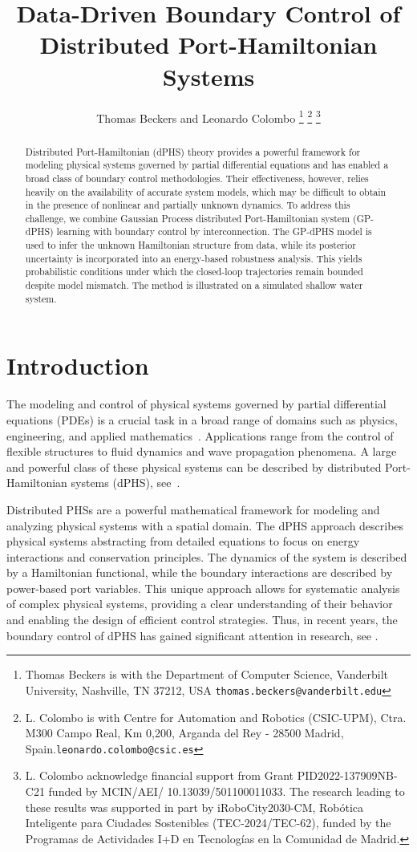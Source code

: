 \documentclass[letterpaper, 10 pt, conference]{ieeeconf}  %
\title{\LARGE \bf
Data-Driven Boundary Control of Distributed Port-Hamiltonian Systems
}
\author{Thomas Beckers and Leonardo Colombo%
\thanks{Thomas Beckers is with the Department of Computer Science, Vanderbilt University, Nashville, TN 37212, USA {\tt\small thomas.beckers@vanderbilt.edu}}%
\thanks{L. Colombo is with Centre for Automation and Robotics (CSIC-UPM), Ctra. M300 Campo Real, Km 0,200, Arganda
del Rey - 28500 Madrid, Spain.{\tt\small leonardo.colombo@csic.es}} 
\thanks{ L. Colombo acknowledge financial support from Grant PID2022-137909NB-C21 funded by MCIN/AEI/ 10.13039/501100011033. The research leading to these results was supported in part by iRoboCity2030-CM, Robótica Inteligente para Ciudades Sostenibles (TEC-2024/TEC-62), funded by the Programas de Actividades I+D en Tecnologías en la Comunidad de Madrid.}
}
\newcounter{part} %
\begin{document}
\maketitle
\thispagestyle{empty}
\pagestyle{empty}


\begin{abstract}
Distributed Port-Hamiltonian (dPHS) theory provides a powerful framework for modeling physical systems governed by partial differential equations and has enabled a broad class of boundary control methodologies. Their effectiveness, however, relies heavily on the availability of accurate system models, which may be difficult to obtain in the presence of nonlinear and partially unknown dynamics. To address this challenge, we combine Gaussian Process distributed Port-Hamiltonian system (GP-dPHS) learning with boundary control by interconnection. The GP-dPHS model is used to infer the unknown Hamiltonian structure from data, while its posterior uncertainty is incorporated into an energy-based robustness analysis. This yields probabilistic conditions under which the closed-loop trajectories remain bounded despite model mismatch. The method is illustrated on a simulated shallow water system.
\end{abstract}


\section{Introduction}
The modeling and control of physical systems governed by partial differential equations (PDEs) is a crucial task in a broad range of domains such as physics, engineering, and applied mathematics~\cite{derler2011modeling}. Applications range from the control of flexible structures to fluid dynamics and wave propagation phenomena. A large and powerful class of these physical systems can be described by distributed Port-Hamiltonian systems (dPHS), see~\cite{van2002hamiltonian, macchelli2004port}.

Distributed PHSs are a powerful mathematical framework for modeling and analyzing physical systems with a spatial domain. The dPHS approach describes physical systems abstracting from detailed equations to focus on energy interactions and conservation principles. The dynamics of the system is described by a Hamiltonian functional, while the boundary interactions are described by power-based port variables. This unique approach allows for systematic analysis of complex physical systems, providing a clear understanding of their behavior and enabling the design of efficient control strategies. Thus, in recent years, the boundary control of dPHS has gained significant attention in research, see \cite{van2000l2, le2005dirac,schoberl2012casimir}.
\end{document}
